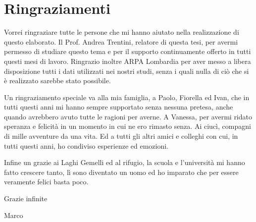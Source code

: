 




\chapter*{Ringraziamenti}
Vorrei ringraziare tutte le persone che mi hanno aiutato nella realizzazione di questo elaborato.  
Il Prof. Andrea Trentini, relatore di questa tesi, per avermi permesso di studiare questo tema e per il supporto continuamente offerto in tutti questi mesi di lavoro. Ringrazio inoltre ARPA Lombardia per aver messo a libera disposizione tutti i dati utilizzati nei nostri studi, senza i quali nulla di ciò che si è realizzato sarebbe stato possibile.%

Un ringraziamento speciale va alla mia famiglia, a Paolo, Fiorella ed Ivan, che in tutti questi anni mi hanno sempre supportato senza nessuna pretesa, anche quando avrebbero avuto tutte le ragioni per averne.  
A Vanessa, per avermi ridato speranza e felicità in un momento in cui ne ero rimasto senza.  
Ai ciucì, compagni di mille avventure da una vita. Ed a tutti gli altri amici e colleghi con cui, in tutti questi anni, ho condiviso esperienze ed emozioni.  

Infine un grazie ai Laghi Gemelli ed al rifugio, la scuola e l'università mi hanno fatto crescere tanto, lì sono diventato un uomo ed ho imparato che per essere veramente felici basta poco.

\vspace{5mm}
Grazie infinite

\vspace{5mm}
Marco


